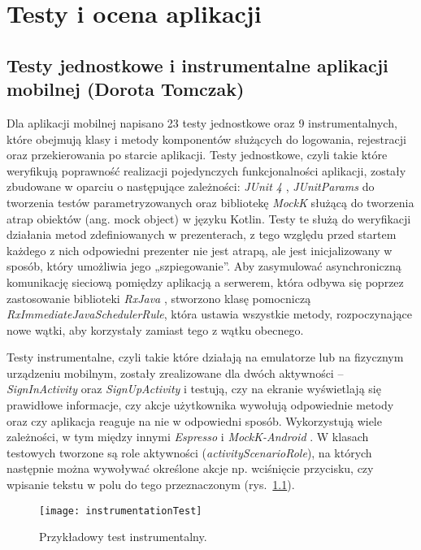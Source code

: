 \chapter{Testy i ocena aplikacji}

\section{Testy jednostkowe i instrumentalne aplikacji mobilnej (Dorota Tomczak)}
\par Dla aplikacji mobilnej napisano 23 testy jednostkowe oraz 9 instrumentalnych, które obejmują klasy i metody komponentów służących do logowania, rejestracji oraz przekierowania po starcie aplikacji. Testy jednostkowe, czyli takie które weryfikują poprawność realizacji pojedynczych funkcjonalności aplikacji, zostały zbudowane w oparciu o następujące zależności: \textit{JUnit 4} \cite{JUnit}, \textit{JUnitParams} \cite{JUnitParams} do tworzenia testów parametryzowanych oraz bibliotekę \textit{MockK} \cite{MockK} służącą do tworzenia atrap obiektów (ang. mock object) w języku Kotlin. Testy te służą do weryfikacji działania metod zdefiniowanych w prezenterach, z tego względu przed startem każdego z nich odpowiedni prezenter nie jest atrapą, ale jest inicjalizowany w sposób, który umożliwia jego „szpiegowanie”. Aby zasymulować asynchroniczną komunikację sieciową pomiędzy aplikacją a serwerem, która odbywa się poprzez zastosowanie biblioteki \textit{RxJava} \cite{RxJava}, stworzono klasę pomocniczą \textit{RxImmediateJavaSchedulerRule}, która ustawia wszystkie metody, rozpoczynające nowe wątki, aby korzystały zamiast tego z wątku obecnego.
\par Testy instrumentalne, czyli takie które działają na emulatorze lub na fizycznym urządzeniu mobilnym, zostały zrealizowane dla dwóch aktywności – \textit{SignInActivity} oraz \textit{SignUpActivity} i testują, czy na ekranie wyświetlają się prawidłowe informacje, czy akcje użytkownika wywołują odpowiednie metody oraz czy aplikacja reaguje na nie w odpowiedni sposób. Wykorzystują wiele zależności, w tym między innymi \textit{Espresso} \cite{Espresso} i \textit{MockK-Android} \cite{MockK-Android}. W klasach testowych tworzone są role aktywności (\textit{activityScenarioRole}), na których następnie można wywoływać określone akcje np. wciśnięcie przycisku, czy wpisanie tekstu w polu do tego przeznaczonym (rys.~\ref{fig:instrumentationTest}).

\begin{figure}[h]
\centering
\texttt{[image: instrumentationTest]}
\caption{Przykładowy test instrumentalny.}
\label{fig:instrumentationTest}
\end{figure}

